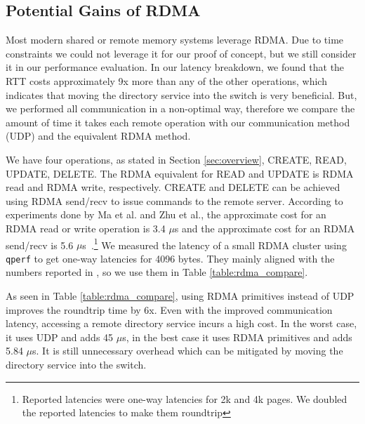 \subsection{Potential Gains of RDMA}
Most modern shared or remote memory systems leverage RDMA. Due to time constraints we could not leverage it for our proof of concept, but we still consider it in our performance evaluation. In our latency breakdown, we found that the RTT costs approximately 9x more than any of the other operations, which indicates that moving the directory service into the switch is very beneficial. But, we performed all communication in a non-optimal way, therefore we compare the amount of time it takes each remote operation with our communication method (UDP) and the equivalent RDMA method.

We have four operations, as stated in Section \ref{sec:overview}, CREATE, READ, UPDATE, DELETE. The RDMA equivalent for READ and UPDATE is RDMA read and RDMA write, respectively. CREATE and DELETE can be achieved using RDMA send/recv to issue commands to the remote server. According to experiments done by Ma et al. and Zhu et al., the approximate cost for an RDMA read or write operation is 3.4 $\mu$s and the approximate cost for an RDMA send/recv is 5.6 $\mu$s~\cite{Ma2016, Zhu2015}.\footnote{Reported latencies were one-way latencies for 2k and 4k pages. We doubled the reported latencies to make them roundtrip} We measured the latency of a small RDMA cluster using \texttt{qperf} to get one-way latencies for 4096 bytes. They mainly aligned with the numbers reported in \cite{Ma2016, Zhu2015}, so we use them in Table \ref{table:rdma_compare}.

As seen in Table \ref{table:rdma_compare}, using RDMA primitives instead of UDP improves the roundtrip time by 6x. Even with the improved communication latency, accessing a remote directory service incurs a high cost. In the worst case, it uses UDP and adds 45 $\mu$s, in the best case it uses RDMA primitives and adds 5.84 $\mu$s. It is still unnecessary overhead which can be mitigated by moving the directory service into the switch.

